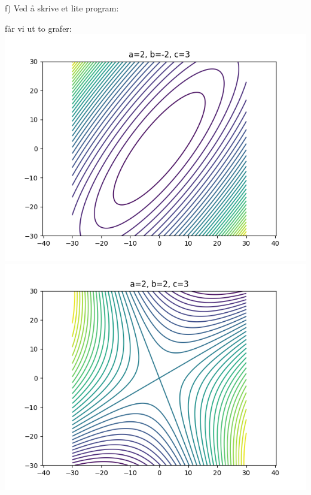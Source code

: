 \documentclass[12pt, a4paper]{article}
\begin{document}
\newpage

f) Ved å skrive et lite program:


får vi ut to grafer: \\
\includegraphics[scale=0.5]{ellipse}
\includegraphics[scale=0.5]{hyperbolic}



    
\end{document}
